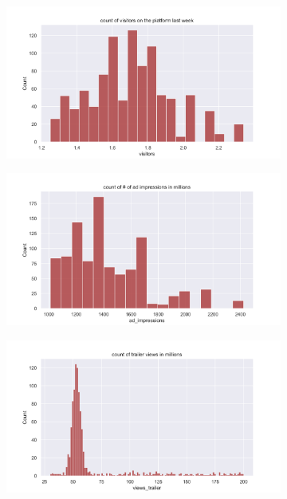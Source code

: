 \documentclass[12pt,a4paper]{style}
\begin{document}
\begin{figure}[h]
	\centering
	\begin{subfigure}[t]{0.49\textwidth}
		\includegraphics[width=\textwidth]{visit_dist.png}
		\caption{}
		\label{fig:visit distribution}
	\end{subfigure}
	\hfill
	\begin{subfigure}[t]{0.49\textwidth}
		\includegraphics[width=\textwidth]{adimpressions_dist.png}
		\caption{}
		\label{fig:ad_impression distribution}
	\end{subfigure}
	\begin{subfigure}[t]{0.49\textwidth}
	\includegraphics[width=\textwidth]{trailer_views_dist.png}

\end{subfigure}
\end{figure}
\end{document}
